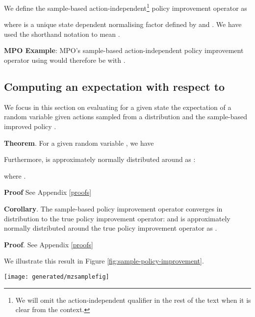 \documentclass{article}
\begin{document}
We define the sample-based action-independent\footnote{We will omit the action-independent qualifier in the rest of the text when it is clear from the context.} policy improvement operator as

where  is a unique state dependent normalising factor defined by  and .
We have used the shorthand notation  to mean .

\textbf{MPO Example}: MPO's sample-based action-independent policy improvement operator using  would therefore be  with .



\subsection{Computing an expectation with respect to }
\label{expectation-ipi}
We focus in this section on evaluating for a given state  the expectation  of a random variable  given actions  sampled from a distribution  and the sample-based improved policy .

\textbf{Theorem}. For a given random variable , we have


Furthermore,  is approximately normally distributed around  as :

where .

\textbf{Proof} See Appendix \ref{proofs}

\textbf{Corollary}.
The sample-based policy improvement operator converges in distribution to the true policy improvement operator:
 and is approximately normally distributed around the true policy improvement operator as .

\textbf{Proof}. See Appendix \ref{proofs}

We illustrate this result in Figure \ref{fig:sample-policy-improvement}.

\begin{figure*}
\texttt{[image: generated/mzsamplefig]}
\vspace*{-7mm}
\caption[]{
\label{fig:sample-policy-improvement}
\textbf{Sample-based Policy Improvement.} On the left, the current policy . Next,  actions  are sampled from a proposal distribution  and  is the corresponding empirical distribution. A sample-based improved policy  is then built. As the number of samples  increases   converges to the improved policy .
}
\end{figure*}
\end{document}
